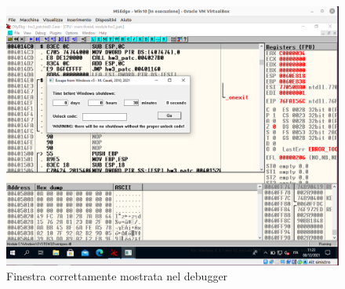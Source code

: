 \documentclass{article}
\begin{document}
\newpage
\begin{figure}
\includegraphics[scale=0.4]{immagini/correct_window_odbg}
\caption{Finestra correttamente mostrata nel debugger}
\label{Fig8}
\end{figure}
\end{document}
